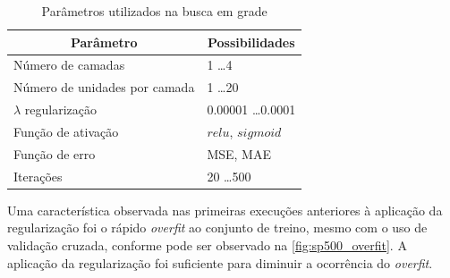 \documentclass[
    12pt,
    oneside,
    a4paper,
    english,
    brazil
]{abntex2}
\begin{document}
\begin{table}[ht]
\centering
\caption{Parâmetros utilizados na busca em grade}\label{tab:gridsearch}
\begin{tabular}{l l}
\multicolumn{1}{c}{Parâmetro}        & \multicolumn{1}{c}{Possibilidades}  \\
    \toprule
    Número de camadas                & 1 \ldots 4                          \\
    Número de unidades por camada    & 1 \ldots 20                         \\
    $\lambda$ regularização          & 0.00001 \ldots 0.0001               \\
    Função de ativação               & $relu$, $sigmoid$                   \\
    Função de erro                   & MSE, MAE                            \\
    Iterações                        & 20 \ldots 500
\end{tabular}
\end{table}

Uma característica observada nas primeiras execuções anteriores
à  aplicação da  regularização  foi  o rápido  \textit{overfit}  ao conjunto de treino, mesmo com o uso de validação cruzada, conforme pode ser observado na  \autoref{fig:sp500_overfit}. A aplicação da  regularização  foi suficiente  para
diminuir a ocorrência do \textit{overfit}.
\end{document}
